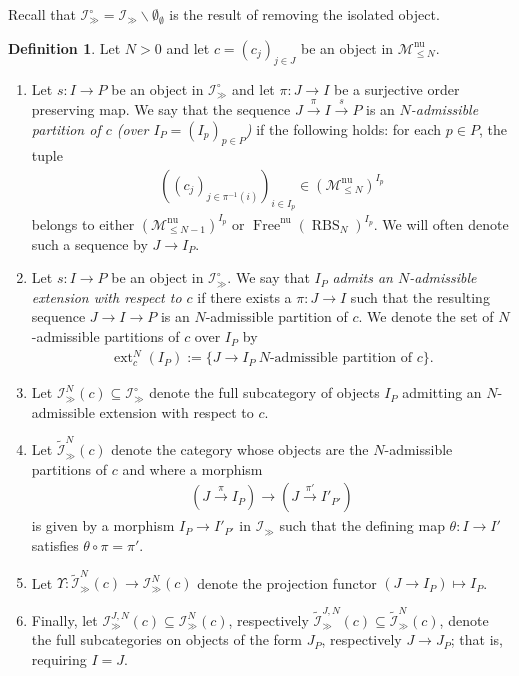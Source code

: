 \documentclass[12pt, reqno]{amsart}
\theoremstyle{plain}
\theoremstyle{definition}
\newtheorem{definition}[theorem]{Definition}
\begin{document}
Recall that $\mathcal{I}_\gg^\circ=\mathcal{I}_\gg\smallsetminus \emptyset_\emptyset$ is the result of removing the isolated object.

\begin{definition}
Let $N>0$ and let $c=(c_j)_{j\in J}$ be an object in $\mathscr{M}^{\operatorname{nu}}_{\leq N}$.
\begin{enumerate}
\item Let $s\colon I\rightarrow P$ be an object in $\mathcal{I}^\circ_\gg$ and let $\pi\colon J\rightarrow I$ be a surjective order preserving map. We say that the sequence $J\xrightarrow{\pi}I\xrightarrow{s} P$ is an \textit{$N$-admissible partition of $c$ (over $I_P=(I_p)_{p\in P}$)} if the following holds: for each $p\in P$, the tuple
\begin{align*}
((c_j)_{j\in \pi^{-1}(i)})_{i\in I_p} \in (\mathscr{M}^{\operatorname{nu}}_{\leq N})^{I_p}
\end{align*}
belongs to either $(\mathscr{M}^{\operatorname{nu}}_{\leq N-1})^{I_p}$ or $\operatorname{Free}^{\operatorname{nu}}(\operatorname{RBS}_N)^{I_p}$. We will often denote such a sequence by $J\rightarrow I_P$.
\item Let $s\colon I\rightarrow P$ be an object in $\mathcal{I}_\gg^\circ$. We say that $I_P$ \textit{admits an $N$-admissible extension with respect to $c$} if there exists a $\pi\colon J\rightarrow I$ such that the resulting sequence $J\rightarrow I\rightarrow P$ is an $N$-admissible partition of $c$. We denote the set of $N$-admissible partitions of $c$ over $I_P$ by
\begin{align*}
\operatorname{ext}_c^N(I_P):=\{J\rightarrow I_P \ N\text{-admissible partition of }c\}.
\end{align*}
\item Let $\mathcal{I}^N_\gg(c)\subseteq \mathcal{I}^\circ_\gg$ denote the full subcategory of objects $I_P$ admitting an $N$-admissible extension with respect to $c$.
\item Let $\widetilde{\mathcal{I}}^N_\gg(c)$ denote the category whose objects are the $N$-admissible partitions of $c$ and where a morphism
\begin{align*}
(J\xrightarrow{\pi} I_P)\rightarrow (J\xrightarrow{\pi'} I'_{P'})
\end{align*}
is given by a morphism $I_P\rightarrow I'_{P'}$ in $\mathcal{I}_\gg$ such that the defining map $\theta\colon I\rightarrow I'$ satisfies $\theta\circ \pi=\pi'$.
\item Let $\Upsilon\colon \widetilde{\mathcal{I}}^N_\gg(c)\rightarrow\mathcal{I}^N_\gg(c)$ denote the projection functor $(J\rightarrow I_P)\mapsto I_P$.
\item Finally, let $\mathcal{I}_\gg^{J,N}(c)\subseteq \mathcal{I}^N_\gg(c)$, respectively $\widetilde{\mathcal{I}}_\gg^{J,N}(c)\subseteq \widetilde{\mathcal{I}}^N_\gg(c)$, denote the full subcategories on objects of the form $J_P$, respectively $J\rightarrow J_P$; that is, requiring $I=J$.\qedhere
\end{enumerate}
\end{definition}
\end{document}
